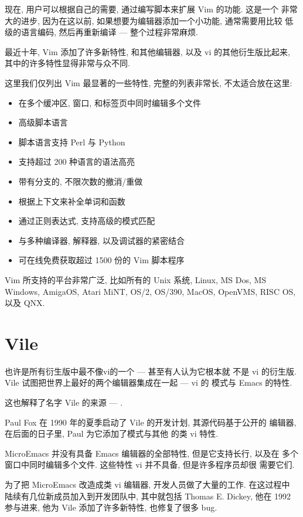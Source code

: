 现在, 用户可以根据自己的需要, 通过编写脚本来扩展 Vim 的功能. 这是一个
非常大的进步, 因为在这以前, 如果想要为编辑器添加一个小功能, 通常需要用比较
低级的语言编码, 然后再重新编译 --- 整个过程非常麻烦.

最近十年, Vim 添加了许多新特性, 和其他编辑器, 以及 vi 的其他衍生版比起来,
其中的许多特性显得非常与众不同.

这里我们仅列出 Vim 最显著的一些特性, 完整的列表非常长, 不太适合放在这里:
\begin{itemize}
    \item 在多个缓冲区, 窗口, 和标签页中同时编辑多个文件
    \item 高级脚本语言
    \item 脚本语言支持 Perl 与 Python
    \item 支持超过 200 种语言的语法高亮
    \item 带有分支的, 不限次数的撤消/重做
    \item 根据上下文来补全单词和函数
    \item 通过正则表达式, 支持高级的模式匹配
    \item 与多种编译器, 解释器, 以及调试器的紧密结合
    \item 可在线免费获取超过 1500 份的 Vim 脚本程序
\end{itemize}
Vim 所支持的平台非常广泛, 比如所有的 Unix 系统, Linux, MS Dos, MS Windows,
AmigaOS, Atari MiNT, OS/2, OS/390, MacOS, OpenVMS, RISC OS, 以及 QNX.

\section{Vile}
 也许是所有衍生版中最不像vi的一个 --- 甚至有人认为它根本就
不是 vi 的衍生版. Vile 试图把世界上最好的两个编辑器集成在一起 --- vi 的
模式与 Emacs 的特性.

这也解释了名字 Vile 的来源 --- .

Paul Fox 在 1990 年的夏季启动了 Vile 的开发计划, 其源代码基于公开的
 编辑器, 在后面的日子里, Paul 为它添加了模式与其他
的类 vi 特性.

MicroEmacs 并没有具备 Emacs 编辑器的全部特性, 但是它支持长行, 以及在
多个窗口中同时编辑多个文件. 这些特性 vi 并不具备, 但是许多程序员却很
需要它们.

为了把 MicroEmacs 改造成类 vi 编辑器, 开发人员做了大量的工作. 在这过程中 
陆续有几位新成员加入到开发团队中, 其中就包括 Thomas E. Dickey, 他在 1992 
参与进来, 他为 Vile 添加了许多新特性, 也修复了很多 bug.

